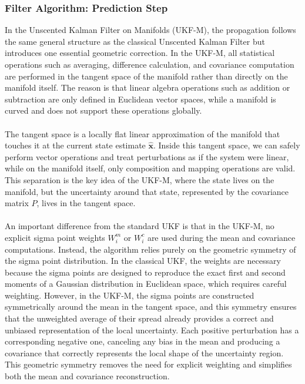 \subsubsection{Filter Algorithm: Prediction Step}
In the Unscented Kalman Filter on Manifolds (UKF-M), the propagation follows the same general structure as the classical Unscented Kalman Filter but introduces one essential geometric correction. In the UKF-M, all statistical operations such as averaging, difference calculation, and covariance computation are performed in the tangent space of the manifold rather than directly on the manifold itself. The reason is that linear algebra operations such as addition or subtraction are only defined in Euclidean vector spaces, while a manifold is curved and does not support these operations globally.  
\\ \\
The tangent space is a locally flat linear approximation of the manifold that touches it at the current state estimate $\hat{\mathbf{x}}$. Inside this tangent space, we can safely perform vector operations and treat perturbations as if the system were linear, while on the manifold itself, only composition and mapping operations are valid. This separation is the key idea of the UKF-M, where the state lives on the manifold, but the uncertainty around that state, represented by the covariance matrix $P$, lives in the tangent space.  
\\ \\
An important difference from the standard UKF is that in the UKF-M, no explicit sigma point weights $W_i^m$ or $W_i^c$ are used during the mean and covariance computations. Instead, the algorithm relies purely on the geometric symmetry of the sigma point distribution. In the classical UKF, the weights are necessary because the sigma points are designed to reproduce the exact first and second moments of a Gaussian distribution in Euclidean space, which requires careful weighting. However, in the UKF-M, the sigma points are constructed symmetrically around the mean in the tangent space, and this symmetry ensures that the unweighted average of their spread already provides a correct and unbiased representation of the local uncertainty. Each positive perturbation has a corresponding negative one, canceling any bias in the mean and producing a covariance that correctly represents the local shape of the uncertainty region. This geometric symmetry removes the need for explicit weighting and simplifies both the mean and covariance reconstruction.  
\\ \\
